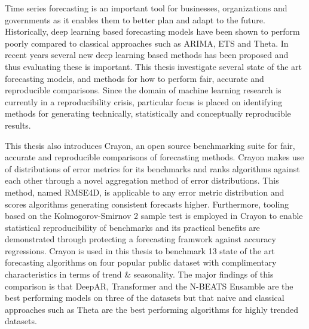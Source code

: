 Time series forecasting is an important tool for businesses, organizations and governments as it enables them to better plan and adapt to the future. Historically, deep learning based forecasting models have been shown to perform poorly compared to classical approaches such as ARIMA, ETS and Theta. In recent years several new deep learning based methods has been proposed and thus evaluating these is important. This thesis investigate several state of the art forecasting models, and methods for how to perform fair, accurate and reproducible comparisons. Since the domain of machine learning research is currently in a reproducibility crisis, particular focus is placed on identifying methods for generating technically, statistically and conceptually reproducible results.

This thesis also introduces Crayon, an open source benchmarking suite for fair, accurate and reproducible comparisons of forecasting methods. Crayon makes use of distributions of error metrics for its benchmarks and ranks algorithms against each other through a novel aggregation method of error distributions. This method, named RMSE4D, is applicable to any error metric distribution and scores algorithms generating consistent forecasts higher. Furthermore, tooling based on the Kolmogorov-Smirnov 2 sample test is employed in Crayon to enable statistical reproducibility of benchmarks and its practical benefits are demonstrated through protecting a forecasting framwork against accuracy regressions. Crayon is used in this thesis to benchmark 13 state of the art forecasting algorithms on four popular public dataset with complimentary characteristics in terms of trend \& seasonality. The major findings of this comparison is that DeepAR, Transformer and the N-BEATS Ensamble are the best performing models on three of the datasets but that naive and classical approaches such as Theta are the best performing algorithms for highly trended datasets.

